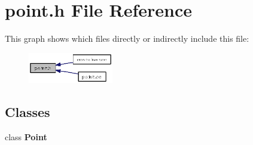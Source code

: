 \section{point.h File Reference}
\label{point_8h}


This graph shows which files directly or indirectly include this file:\begin{figure}[H]
\begin{center}
\leavevmode
\includegraphics[width=105pt]{point_8h__dep__incl}
\end{center}
\end{figure}
\subsection*{Classes}
\begin{CompactItemize}
\item 
class {\bf Point}
\end{CompactItemize}
